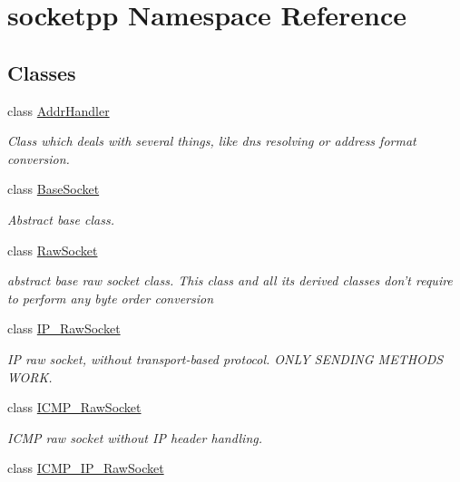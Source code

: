 \hypertarget{namespacesocketpp}{
\section{socketpp Namespace Reference}
\label{namespacesocketpp}
}
\subsection*{Classes}
\begin{CompactItemize}
\item 
class \hyperlink{classsocketpp_1_1AddrHandler}{AddrHandler}
\begin{CompactList}\small\item\em Class which deals with several things, like dns resolving or address format conversion. \item\end{CompactList}\item 
class \hyperlink{classsocketpp_1_1BaseSocket}{BaseSocket}
\begin{CompactList}\small\item\em Abstract base class. \item\end{CompactList}\item 
class \hyperlink{classsocketpp_1_1RawSocket}{RawSocket}
\begin{CompactList}\small\item\em abstract base raw socket class. This class and all its derived classes don't require to perform any byte order conversion \item\end{CompactList}\item 
class \hyperlink{classsocketpp_1_1IP__RawSocket}{IP\_\-RawSocket}
\begin{CompactList}\small\item\em IP raw socket, without transport-based protocol. ONLY SENDING METHODS WORK. \item\end{CompactList}\item 
class \hyperlink{classsocketpp_1_1ICMP__RawSocket}{ICMP\_\-RawSocket}
\begin{CompactList}\small\item\em ICMP raw socket without IP header handling. \item\end{CompactList}\item 
class \hyperlink{classsocketpp_1_1ICMP__IP__RawSocket}{ICMP\_\-IP\_\-RawSocket}

\end{CompactItemize}
